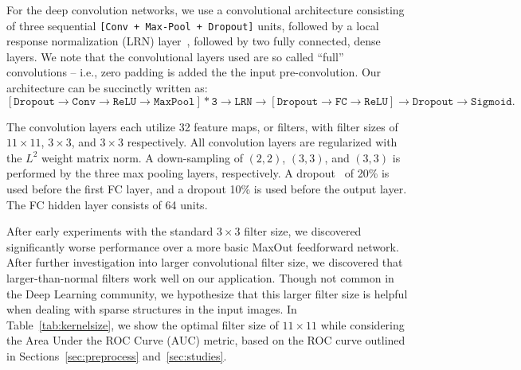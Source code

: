 For the deep convolution networks, we use a convolutional architecture consisting of three sequential \texttt{[Conv + Max-Pool + Dropout]} units, followed by a local response normalization (LRN) layer~\cite{dropout:and:LRN}, followed by two fully connected, dense layers. We note that the convolutional layers used are so called ``full'' convolutions -- i.e., zero padding is added the the input pre-convolution. Our architecture can be succinctly written as:
\begin{equation}
  \mathtt{[Dropout \rightarrow Conv \rightarrow ReLU \rightarrow MaxPool] * 3 \rightarrow LRN \rightarrow [Dropout \rightarrow FC \rightarrow ReLU]  \rightarrow Dropout \rightarrow Sigmoid}.
\end{equation}

The convolution layers each utilize 32 feature maps, or filters, with filter sizes of $11\times 11$, $3\times 3$, and $3\times 3$ respectively.  All convolution layers are regularized with the $L^{2}$ weight matrix norm.  A down-sampling of $(2, 2)$, $(3, 3)$, and $(3, 3)$ is performed by the three max pooling layers, respectively.  A dropout~\cite{dropout:and:LRN} of 20\% is used before the first FC layer, and a dropout 10\% is used before the output layer.  The FC hidden layer consists of 64 units.

After early experiments with the standard $3\times 3$ filter size, we discovered significantly worse performance over a more basic MaxOut \cite{maxout:goodfellow} feedforward network. After further investigation into larger convolutional filter size, we discovered that larger-than-normal filters work well on our application. Though not common in the Deep Learning community, we hypothesize that this larger filter size is helpful when dealing with sparse structures in the input images. In Table~\ref{tab:kernelsize}, we show the optimal filter size of $11\times11$ while considering the Area Under the ROC Curve (AUC) metric, based on the ROC curve outlined in Sections~\ref{sec:preprocess} and~\ref{sec:studies}.

